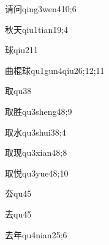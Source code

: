 \begin{verbete}{请问}{qing3wen4}{10;6}
\end{verbete}

\begin{verbete}{秋天}{qiu1tian1}{9;4}
\end{verbete}

\begin{verbete}{球}{qiu2}{11}
\end{verbete}

\begin{verbete}{曲棍球}{qu1gun4qiu2}{6;12;11}
\end{verbete}

\begin{verbete}{取}{qu3}{8}
\end{verbete}

\begin{verbete}{取胜}{qu3sheng4}{8;9}
\end{verbete}

\begin{verbete}{取水}{qu3shui3}{8;4}
\end{verbete}

\begin{verbete}{取现}{qu3xian4}{8;8}
\end{verbete}

\begin{verbete}{取悦}{qu3yue4}{8;10}
\end{verbete}

\begin{verbete}{厺}{qu4}{5}
\end{verbete}

\begin{verbete}{去}{qu4}{5}
\end{verbete}

\begin{verbete}{去年}{qu4nian2}{5;6}
\end{verbete}

